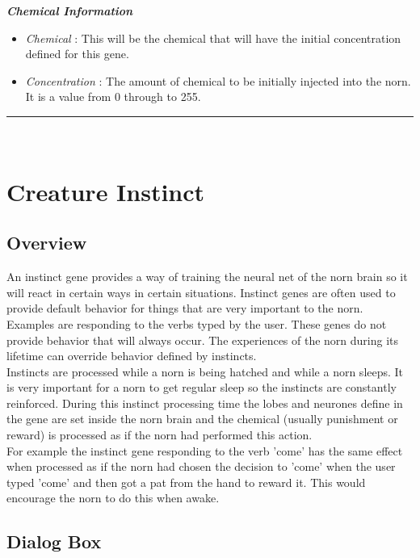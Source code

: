 \documentclass[11pt,twoside,a4paper]{article}
\begin{document}
\textbf{\textit{Chemical Information}}
\begin{itemize}
	\item[] \emph{Chemical} : This will be the chemical that will have the initial concentration defined for this gene.
	\item[] \emph{Concentration} : The amount of chemical to be initially injected into the norn. It is a value from 0 through to 255.
\end{itemize}

\rule{10cm}{0.5mm}~\\

\section{Creature Instinct} %

\subsection{Overview}

An instinct gene provides a way of training the neural net of the norn brain so it will react in certain ways in certain situations. Instinct genes are often used to provide default behavior for things that are very important to the norn. Examples are responding to the verbs typed by the user. These genes do not provide behavior that will always occur. The experiences of the norn during its lifetime can override behavior defined by instincts.~\\

Instincts are processed while a norn is being hatched and while a norn sleeps. It is very important for a norn to get regular sleep so the instincts are constantly reinforced. During this instinct processing time the lobes and neurones define in the gene are set inside the norn brain and the chemical (usually punishment or reward) is processed as if the norn had performed this action.~\\

For example the instinct gene responding to the verb 'come' has the same effect when processed as if the norn had chosen the decision to 'come' when the user typed 'come' and then got a pat from the hand to reward it. This would encourage the norn to do this when awake.

\clearpage

\subsection{Dialog Box}
\end{document}
